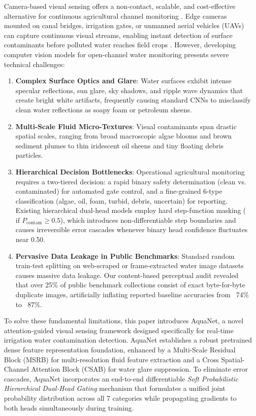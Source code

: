 \documentclass[journal]{IEEEtran}
\newcommand{\method}{AquaNet}
\begin{document}
Camera-based visual sensing offers a non-contact, scalable, and cost-effective alternative for continuous agricultural channel monitoring \cite{drone_pollution_2024, towards_precision_agri_2024}. Edge cameras mounted on canal bridges, irrigation gates, or unmanned aerial vehicles (UAVs) can capture continuous visual streams, enabling instant detection of surface contaminants before polluted water reaches field crops \cite{cctv_irrigation_2023, superdove_water_2023}. However, developing computer vision models for open-channel water monitoring presents severe technical challenges:
\begin{enumerate}
    \item \textbf{Complex Surface Optics and Glare}: Water surfaces exhibit intense specular reflections, sun glare, sky shadows, and ripple wave dynamics that create bright white artifacts, frequently causing standard CNNs to misclassify clean water reflections as soapy foam or petroleum sheens.
    \item \textbf{Multi-Scale Fluid Micro-Textures}: Visual contaminants span drastic spatial scales, ranging from broad macroscopic algae blooms and brown sediment plumes to thin iridescent oil sheens and tiny floating debris particles.
    \item \textbf{Hierarchical Decision Bottlenecks}: Operational agricultural monitoring requires a two-tiered decision: a rapid binary safety determination (clean vs. contaminated) for automated gate control, and a fine-grained 6-type classification (algae, oil, foam, turbid, debris, uncertain) for reporting. Existing hierarchical dual-head models employ hard step-function masking ($\text{if } P_{\text{contam}} \ge 0.5$), which introduces non-differentiable step boundaries and causes irreversible error cascades whenever binary head confidence fluctuates near 0.50.
    \item \textbf{Pervasive Data Leakage in Public Benchmarks}: Standard random train-test splitting on web-scraped or frame-extracted water image datasets causes massive data leakage. Our content-based perceptual audit revealed that over 25\% of public benchmark collections consist of exact byte-for-byte duplicate images, artificially inflating reported baseline accuracies from ~74\% to ~87\%.
\end{enumerate}

To solve these fundamental limitations, this paper introduces \method{}, a novel attention-guided visual sensing framework designed specifically for real-time irrigation water contamination detection. \method{} establishes a robust pretrained dense feature representation foundation, enhanced by a Multi-Scale Residual Block (MSRB) for multi-resolution fluid feature extraction and a Cross Spatial-Channel Attention Block (CSAB) for water glare suppression. To eliminate error cascades, \method{} incorporates an end-to-end differentiable \emph{Soft Probabilistic Hierarchical Dual-Head Gating} mechanism that formulates a unified joint probability distribution across all 7 categories while propagating gradients to both heads simultaneously during training.
\end{document}
